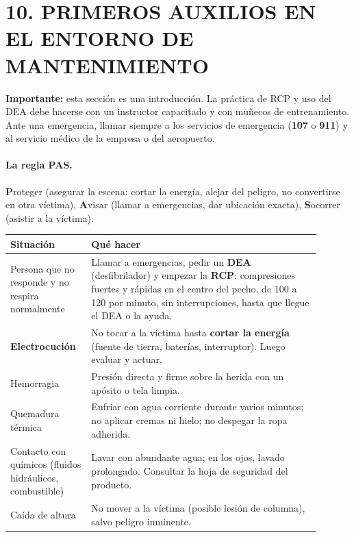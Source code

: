 \section*{10. PRIMEROS AUXILIOS EN EL ENTORNO DE MANTENIMIENTO}

\begin{recuadro}
\textbf{Importante:} esta sección es una introducción. La práctica de RCP y uso del DEA debe
hacerse con un instructor capacitado y con muñecos de entrenamiento. Ante una emergencia, llamar
siempre a los servicios de emergencia (\textbf{107} o \textbf{911}) y al servicio médico de la
empresa o del aeropuerto.
\end{recuadro}

\paragraph*{La regla PAS.} \textbf{P}roteger (asegurar la escena: cortar la energía, alejar del
peligro, no convertirse en otra víctima), \textbf{A}visar (llamar a emergencias, dar ubicación
exacta), \textbf{S}ocorrer (asistir a la víctima).

\begin{center}
\small
\begin{tabular}{|p{0.22\linewidth}|p{0.68\linewidth}|}
\hline
\textbf{Situación} & \textbf{Qué hacer} \\ \hline
Persona que no responde y no respira normalmente & Llamar a emergencias, pedir un
\textbf{DEA} (desfibrilador) y empezar la \textbf{RCP}: compresiones fuertes y rápidas en el centro
del pecho, de 100 a 120 por minuto, sin interrupciones, hasta que llegue el DEA o la ayuda. \\
\hline
\textbf{Electrocución} & No tocar a la víctima hasta \textbf{cortar la energía} (fuente de tierra,
baterías, interruptor). Luego evaluar y actuar. \\ \hline
Hemorragia & Presión directa y firme sobre la herida con un apósito o tela limpia. \\ \hline
Quemadura térmica & Enfriar con agua corriente durante varios minutos; no aplicar cremas ni
hielo; no despegar la ropa adherida. \\ \hline
Contacto con químicos (fluidos hidráulicos, combustible) & Lavar con abundante agua; en los ojos,
lavado prolongado. Consultar la hoja de seguridad del producto. \\ \hline
Caída de altura & No mover a la víctima (posible lesión de columna), salvo peligro inminente. \\
\hline
\end{tabular}
\end{center}

